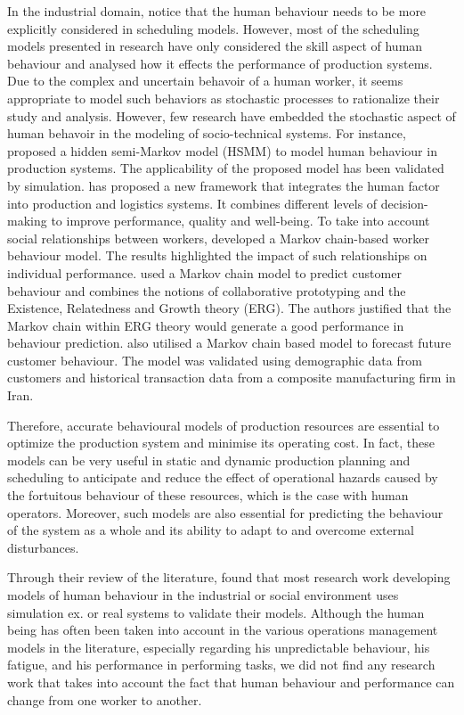 \documentclass[review,12pt, 3p, times]{elsarticle}
\begin{document}
In the industrial domain, \citep{Bogataj2018,Onay2023,Bentefouet2012} notice that the human behaviour needs to be more explicitly considered in scheduling models. However, most of the scheduling models presented in research have only considered the skill aspect of human behaviour and analysed how it effects the performance of production systems. 
Due to the complex and uncertain behavoir of a human worker, it seems appropriate to model such behaviors as stochastic processes to rationalize their study and analysis. However, few research have embedded the stochastic aspect of human behavoir in the modeling of socio-technical systems. For instance,  \citep{lin2022human} proposed a hidden semi-Markov model (HSMM) to model human behaviour in production systems. The applicability of the proposed model has been validated by simulation.
\citep{vijayakumar2022framework} has proposed a new framework that integrates the human factor into production and logistics systems. It combines different levels of decision-making to improve performance, quality and well-being.
To take into account social relationships between workers, \citep{elkosantini2009integration} developed a Markov chain-based worker behaviour model. The results highlighted the impact of such relationships on individual performance.
\citep{chang2008synthesized} used a Markov chain model to predict customer behaviour and combines the notions of collaborative prototyping and the Existence, Relatedness and Growth theory (ERG). The authors justified that the Markov chain within ERG theory would generate a good performance in behaviour prediction. \citep{tarokh2017} also utilised a Markov chain based model to forecast future customer behaviour. The model was validated using demographic data from customers and historical transaction data from a composite manufacturing firm in Iran.
	
Therefore, accurate behavioural models of production resources are essential to optimize the production system and minimise its operating cost. In fact, these models can be very useful in static and dynamic production planning and scheduling to anticipate and reduce the effect of operational hazards caused by the fortuitous behaviour of these resources, which is the case with human operators. Moreover, such models are also essential for predicting the behaviour of the system as a whole and its ability to adapt to and overcome external disturbances.

Through their review of the literature, \citep{Jahanmahin2022} found that most research work developing models of human behaviour in the industrial or social environment uses simulation ex. \citep{Digiesi2009}  	 or real systems to validate their models. 
Although the human being has often been taken into account in the various operations management models in the literature,
especially regarding his unpredictable behaviour, his fatigue, and his performance in performing tasks, we did not find any research work that takes into account the fact that human behaviour and performance can change from one worker to another.
	
\end{document}
